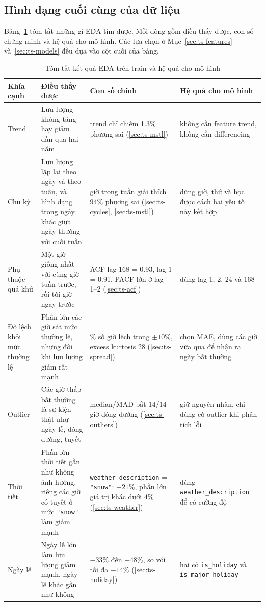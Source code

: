 \subsection{Hình dạng cuối cùng của dữ liệu}
\label{sec:ts-shape}
Bảng~\ref{tab:ts-shape} tóm tắt những gì EDA tìm được. Mỗi dòng gồm điều thấy được, con số chứng minh và hệ quả cho mô hình. Các lựa chọn ở
Mục~\ref{sec:ts-features} và~\ref{sec:ts-models} đều dựa vào cột cuối của bảng.

\begin{table}[H]
\centering
\caption{Tóm tắt kết quả EDA trên train và hệ quả cho mô hình}
\label{tab:ts-shape}
\footnotesize
\begin{tabular}{>{\raggedright\arraybackslash}p{2.0cm}>{\raggedright\arraybackslash}p{4.4cm}>{\raggedright\arraybackslash}p{3.8cm}>{\raggedright\arraybackslash}p{3.8cm}}
\toprule
Khía cạnh & Điều thấy được & Con số chính & Hệ quả cho mô hình\\
\midrule
Trend & Lưu lượng không tăng hay giảm dần qua hai năm & trend chỉ chiếm 1.3\% phương sai (\ref{sec:ts-mstl}) & không cần feature trend, không cần differencing\\
Chu kỳ & Lưu lượng lặp lại theo ngày và theo tuần, và hình dạng trong ngày khác giữa ngày thường với cuối tuần & giờ trong tuần giải thích 94\% phương sai (\ref{sec:ts-cycles}, \ref{sec:ts-mstl}) & dùng giờ, thứ và học được cách hai yếu tố này kết hợp\\
Phụ thuộc quá khứ & Một giờ giống nhất với cùng giờ tuần trước, rồi tới giờ ngay trước & ACF lag 168 = 0.93, lag 1 = 0.91, PACF lớn ở lag 1--2 (\ref{sec:ts-acf}) & dùng lag 1, 2, 24 và 168\\
Độ lệch khỏi mức thường lệ & Phần lớn các giờ sát mức thường lệ, nhưng đôi khi lưu lượng giảm rất mạnh & 65\% số giờ lệch trong $\pm 10\%$, excess kurtosis 28 (\ref{sec:ts-spread}) & chọn MAE, dùng các giờ vừa qua để nhận ra ngày bất thường\\
Outlier & Các giờ thấp bất thường là sự kiện thật như ngày lễ, đóng đường, tuyết & median/MAD bắt 14/14 giờ đóng đường (\ref{sec:ts-outliers}) & giữ nguyên nhãn, chỉ dùng cờ outlier khi phân tích lỗi\\
Thời tiết & Phần lớn thời tiết gần như không ảnh hưởng, riêng các giờ có tuyết ở mức \texttt{"snow"} làm giảm mạnh & \texttt{weather\_description} = \texttt{"snow"}: $-21\%$, phần lớn giá trị khác dưới $4\%$ (\ref{sec:ts-weather}) & dùng \texttt{weather\_description} để có cường độ\\
Ngày lễ & Ngày lễ lớn làm lưu lượng giảm mạnh, ngày lễ khác gần như không & $-33\%$ đến $-48\%$, so với tối đa $-14\%$ (\ref{sec:ts-holiday}) & hai cờ \texttt{is\_holiday} và \texttt{is\_major\_holiday}\\
\bottomrule
\end{tabular}
\end{table}

